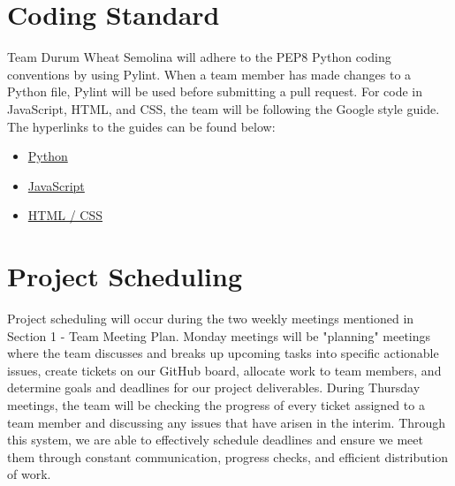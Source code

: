 \documentclass{article}
\begin{document}
\section{Coding Standard}
Team Durum Wheat Semolina will adhere to the PEP8 Python coding conventions by using Pylint. When a team member has made changes to a Python file, Pylint will be used before submitting a pull request. For code in JavaScript, HTML, and CSS, the team will be following the Google style guide. The hyperlinks to the guides can be found below:
\begin{itemize}
	\item \href{https://peps.python.org/pep-0008/}{Python}
	\item \href{https://google.github.io/styleguide/jsguide.html}{JavaScript}
	\item \href{https://google.github.io/styleguide/htmlcssguide.html}{HTML / CSS}
\end{itemize}

\section{Project Scheduling}

Project scheduling will occur during the two weekly meetings mentioned in Section 1 - Team Meeting Plan. Monday meetings will be "planning" meetings where the team discusses and breaks up upcoming tasks into specific actionable issues, create tickets on our GitHub board, allocate work to team members, and determine goals and deadlines for our project deliverables. During Thursday meetings, the team will be checking the progress of every ticket assigned to a team member and discussing any issues that have arisen in the interim. Through this system, we are able to effectively schedule deadlines and ensure we meet them through constant communication, progress checks, and efficient distribution of work.
\end{document}
